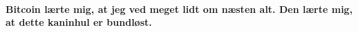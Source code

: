 \paragraph{Bitcoin lærte mig, at jeg ved meget lidt om næsten alt. Den lærte 
mig, at dette kaninhul er bundløst.}

%
%
%
%
%
